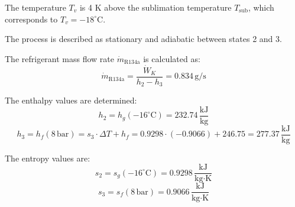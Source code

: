 The temperature \( T_v \) is 4 K above the sublimation temperature \( T_{\text{sub}} \), which corresponds to \( T_v = -18^\circ \text{C} \).  

The process is described as stationary and adiabatic between states 2 and 3.  

The refrigerant mass flow rate \( \dot{m}_{\text{R134a}} \) is calculated as:  
\[
\dot{m}_{\text{R134a}} = \frac{\dot{W}_K}{h_2 - h_3} = 0.834 \, \text{g/s}
\]  

The enthalpy values are determined:  
\[
h_2 = h_g(-16^\circ \text{C}) = 232.74 \, \frac{\text{kJ}}{\text{kg}}
\]  
\[
h_3 = h_f(8 \, \text{bar}) = s_3 \cdot \Delta T + h_f = 0.9298 \cdot (-0.9066) + 246.75 = 277.37 \, \frac{\text{kJ}}{\text{kg}}
\]  

The entropy values are:  
\[
s_2 = s_g(-16^\circ \text{C}) = 0.9298 \, \frac{\text{kJ}}{\text{kg·K}}
\]  
\[
s_3 = s_f(8 \, \text{bar}) = 0.9066 \, \frac{\text{kJ}}{\text{kg·K}}
\]